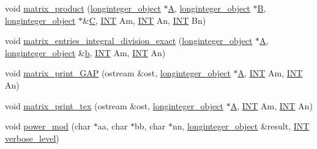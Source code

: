 \begin{DoxyCompactItemize}
void \mbox{\hyperlink{classlonginteger__domain_acf1267141342f981b53103794d1ee3d0}{matrix\+\_\+product}} (\mbox{\hyperlink{classlonginteger__object}{longinteger\+\_\+object}} $\ast$\mbox{\hyperlink{simeon_8_c_a97833f04c3a9c008df5521a2fc291bb4}{A}}, \mbox{\hyperlink{classlonginteger__object}{longinteger\+\_\+object}} $\ast$\mbox{\hyperlink{costas_8_c_ad1f767566c3189fb90e9cffcc5dd4680}{B}}, \mbox{\hyperlink{classlonginteger__object}{longinteger\+\_\+object}} $\ast$\&\mbox{\hyperlink{costas_8_c_aacbbb35f36efadbb40803bfb5480b737}{C}}, \mbox{\hyperlink{galois_8h_a09fddde158a3a20bd2dcadb609de11dc}{I\+NT}} Am, \mbox{\hyperlink{galois_8h_a09fddde158a3a20bd2dcadb609de11dc}{I\+NT}} An, \mbox{\hyperlink{galois_8h_a09fddde158a3a20bd2dcadb609de11dc}{I\+NT}} Bn)
\item 
void \mbox{\hyperlink{classlonginteger__domain_afe1bea3b6cf40deb75db9fc54d4f4676}{matrix\+\_\+entries\+\_\+integral\+\_\+division\+\_\+exact}} (\mbox{\hyperlink{classlonginteger__object}{longinteger\+\_\+object}} $\ast$\mbox{\hyperlink{simeon_8_c_a97833f04c3a9c008df5521a2fc291bb4}{A}}, \mbox{\hyperlink{classlonginteger__object}{longinteger\+\_\+object}} \&\mbox{\hyperlink{alphabet2_8_c_a148e3876077787926724625411d6e7a9}{b}}, \mbox{\hyperlink{galois_8h_a09fddde158a3a20bd2dcadb609de11dc}{I\+NT}} Am, \mbox{\hyperlink{galois_8h_a09fddde158a3a20bd2dcadb609de11dc}{I\+NT}} An)
\item 
void \mbox{\hyperlink{classlonginteger__domain_a2abfccb7354485b5f0428e5c5617442d}{matrix\+\_\+print\+\_\+\+G\+AP}} (ostream \&ost, \mbox{\hyperlink{classlonginteger__object}{longinteger\+\_\+object}} $\ast$\mbox{\hyperlink{simeon_8_c_a97833f04c3a9c008df5521a2fc291bb4}{A}}, \mbox{\hyperlink{galois_8h_a09fddde158a3a20bd2dcadb609de11dc}{I\+NT}} Am, \mbox{\hyperlink{galois_8h_a09fddde158a3a20bd2dcadb609de11dc}{I\+NT}} An)
\item 
void \mbox{\hyperlink{classlonginteger__domain_a8c4b67760aebf25cfe270f7227066576}{matrix\+\_\+print\+\_\+tex}} (ostream \&ost, \mbox{\hyperlink{classlonginteger__object}{longinteger\+\_\+object}} $\ast$\mbox{\hyperlink{simeon_8_c_a97833f04c3a9c008df5521a2fc291bb4}{A}}, \mbox{\hyperlink{galois_8h_a09fddde158a3a20bd2dcadb609de11dc}{I\+NT}} Am, \mbox{\hyperlink{galois_8h_a09fddde158a3a20bd2dcadb609de11dc}{I\+NT}} An)
\item 
void \mbox{\hyperlink{classlonginteger__domain_af9057ed8886e6a2976571b386cde0a64}{power\+\_\+mod}} (char $\ast$aa, char $\ast$bb, char $\ast$nn, \mbox{\hyperlink{classlonginteger__object}{longinteger\+\_\+object}} \&result, \mbox{\hyperlink{galois_8h_a09fddde158a3a20bd2dcadb609de11dc}{I\+NT}} \mbox{\hyperlink{simeon_8_c_a818073fbcc2f439e7c56952f67386122}{verbose\+\_\+level}})

\end{DoxyCompactItemize}
